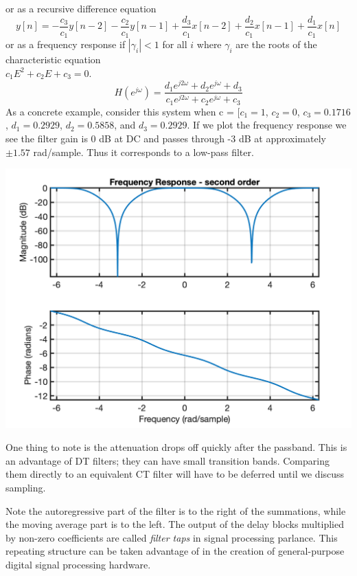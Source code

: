\begin{example}
\begin{center}
\end{center}
or as a recursive difference equation
\[
y[n] = -\frac{c_3}{c_1} y[n-2] - \frac{c_2}{c_1} y[n-1] + \frac{d_3}{c_1} x[n-2] + \frac{d_2}{c_1} x[n-1] + \frac{d_1}{c_1} x[n] 
\]
or as a frequency response if $|\gamma_i| < 1$ for all $i$ where $\gamma_i$ are the roots of the characteristic equation\\ $c_1 E^2 + c_2 E + c_3 = 0$.
\[
H\left(e^{j\omega}\right) = \frac{d_1 e^{j2\omega} + d_2 e^{j\omega} + d_3}{c_1 e^{j2\omega} + c_2 e^{j\omega} + c_3} 
\]
As a concrete example, consider this system when c = [$c_1 = 1$, $c_2 = 0$, $c_3 = 0.1716$, $d_1 = 0.2929$, $d_2 = 0.5858$, and $d_3 = 0.2929$. If we plot the frequency response we see the filter gain is 0 dB at DC and passes through -3 dB at approximately $\pm 1.57$ rad/sample. Thus it corresponds to a low-pass filter.
\begin{center}   
  \includegraphics[scale=0.7]{graphics/lecture25_3.png}
\end{center}
One thing to note is the attenuation drops off quickly after the passband. This is an advantage of DT filters; they can have small transition bands. Comparing them directly to an equivalent CT filter will have to be deferred until we discuss sampling.

Note the autoregressive part of the filter is to the right of the summations, while the moving average part is to the left. The output of the delay blocks multiplied by non-zero coefficients are called \emph{filter taps} in signal processing parlance. This repeating structure can be taken advantage of in the creation of general-purpose digital signal processing hardware.
\end{example}

